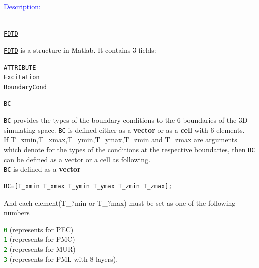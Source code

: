 	\textcolor{blue}{\begin{large}Description:\end{large}}\\
	\hyperref[para:FDTD]{\texttt{FDTD}}
  \begin{myindentpar}\hyperref[para:FDTD]{\texttt{FDTD}}  is a structure in Matlab. It contains 3 fields:
       \begin{myindentpar}\texttt{ATTRIBUTE} \\
	      \texttt{Excitation} \\
	      \texttt{BoundaryCond}
      \end{myindentpar}
  \end{myindentpar}
	\texttt{BC}  
\begin{myindentpar}\texttt{BC} provides the types of the boundary conditions to the 6 boundaries of the 3D simulating space.  
          \texttt{BC} is defined either as a \textbf{vector} or as a \textbf{cell} with 6  elements. \vspace{2mm}\\
          If  T\_xmin,T\_xmax,T\_ymin,T\_ymax,T\_zmin and T\_zmax are  arguments which denote for the types of the conditions at the respective boundaries, then \texttt{BC} can be defined as a vector or a cell as following.\vspace{2mm}\\
          \texttt{BC} is defined as a \textbf{vector}
	\begin{myindentpar}
	  \begin{lstlisting}[caption={\texttt{BC} in the form of a vector},label=BCinvector]
 BC=[T_xmin T_xmax T_ymin T_ymax T_zmin T_zmax]; 
	  \end{lstlisting}
          And   each  element(T\_?min or T\_?max)  must be set as one of the following numbers 
	    \begin{myindentpar}
	      \textcolor{green}{\texttt{0}}   \qquad  (represents for PEC)\\
	      \textcolor{green}{\texttt{1}}   \qquad  (represents for PMC)\\
	      \textcolor{green}{\texttt{2}}   \qquad  (represents for MUR)\\
	      \textcolor{green}{\texttt{3}}   \qquad  (represents for PML with 8 layers).
	    \end{myindentpar}	
      \end{myindentpar}  

\end{myindentpar}
